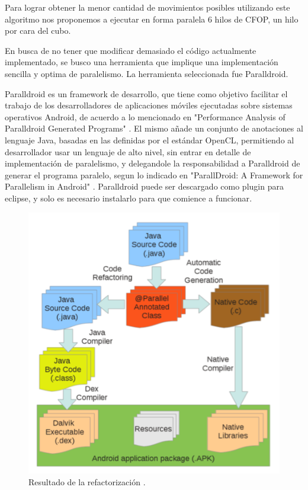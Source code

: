 \documentclass[runningheads,a4paper]{llncs}
\begin{document}
Para lograr obtener la menor cantidad de movimientos posibles utilizando este algoritmo nos proponemos a ejecutar en forma paralela 6 hilos de CFOP, un hilo por cara del cubo.

En busca de no tener que modificar demasiado el código actualmente implementado, se busco una herramienta que implique una implementación sencilla y optima de paralelismo. La herramienta seleccionada fue Paralldroid.

Paralldroid es un framework de desarrollo, que tiene como objetivo facilitar el trabajo de los desarrolladores de aplicaciones móviles ejecutadas sobre sistemas operativos Android, de acuerdo a lo mencionado en "Performance Analysis of Paralldroid Generated Programs" \cite{jour}. El mismo añade un conjunto de anotaciones al lenguaje Java, basadas en las definidas por el estándar OpenCL, permitiendo al desarrollador usar un lenguaje de alto nivel, sin entrar en detalle de implementación de paralelismo, y delegandole la responsabilidad a Paralldroid de generar el programa paralelo, segun lo indicado en "ParallDroid: A Framework for Parallelism in Android" \cite{bookParalldroid}.
Paralldroid puede ser descargado como plugin para eclipse, y solo es necesario instalarlo para que comience a funcionar\cite{jour}.


\begin{figure}
\centering
        \includegraphics[totalheight=4cm]{Modelo.png}
        \caption{Resultado de la refactorización \cite{OpenCLbook}.}
\end{figure}
\end{document}
